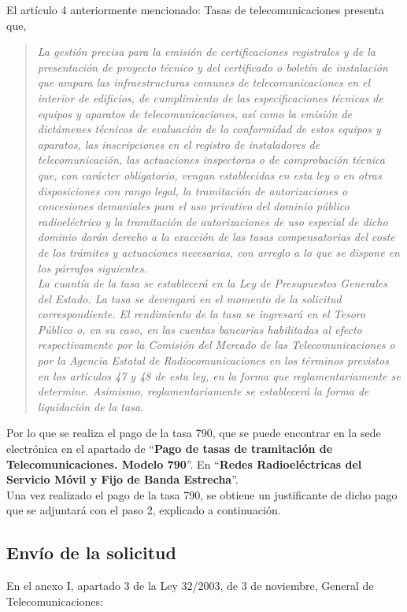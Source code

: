 El artículo 4 anteriormente mencionado: Tasas de telecomunicaciones presenta que,\\
\begin{quote}
\itshape
La gestión precisa para la emisión de certificaciones registrales y de la presentación de proyecto técnico y del certificado o boletín de instalación que ampara las infraestructuras comunes de telecomunicaciones en el interior de edificios, de cumplimiento de las especificaciones técnicas de equipos y aparatos de telecomunicaciones, así como la emisión de dictámenes técnicos de evaluación de la conformidad de estos equipos y aparatos, las inscripciones en el registro de instaladores de telecomunicación, las actuaciones inspectoras o de comprobación técnica que, con carácter obligatorio, vengan establecidas en esta ley o en otras disposiciones con rango legal, la tramitación de autorizaciones o concesiones demaniales para el uso privativo del dominio público radioeléctrico y la tramitación de autorizaciones de uso especial de dicho dominio darán derecho a la exacción de las tasas compensatorias del coste de los trámites y actuaciones necesarias, con arreglo a lo que se dispone en los párrafos siguientes.\\

La cuantía de la tasa se establecerá en la Ley de Presupuestos Generales del Estado. La tasa se devengará en el momento de la solicitud correspondiente. El rendimiento de la tasa se ingresará en el Tesoro Público o, en su caso, en las cuentas bancarias habilitadas al efecto respectivamente por la Comisión del Mercado de las Telecomunicaciones o por la Agencia Estatal de Radiocomunicaciones en los términos previstos en los artículos 47 y 48 de esta ley, en la forma que reglamentariamente se determine. Asimismo, reglamentariamente se establecerá la forma de liquidación de la tasa.
\end{quote}

Por lo que se realiza el pago de la tasa 790, que se puede encontrar en la sede electrónica en el apartado de “\textbf{Pago de tasas de tramitación de Telecomunicaciones. Modelo 790}”. En “\textbf{Redes Radioeléctricas del Servicio Móvil y Fijo de Banda Estrecha}”.\\

Una vez realizado el pago de la tasa 790, se obtiene un justificante de dicho pago que se adjuntará con el paso 2, explicado a continuación.

\subsection{Envío de la solicitud}
En el anexo I, apartado 3 de la Ley 32/2003, de 3 de noviembre, General de Telecomunicaciones:\\

